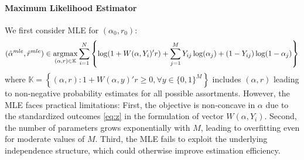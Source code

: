 \documentclass[11pt]{article}
\newcommand{\argmax}{\operatornamewithlimits{argmax}}
\begin{document}
\paragraph{Maximum Likelihood Estimator} We first consider MLE for $(\alpha_0,r_0)$:
$$(\hat \alpha^{mle}, \hat r^{mle}) \in \argmax_{(\alpha,r)\in \mathbb{K}} \sum_{i=1}^N\left\{\log( 1+W(\alpha,Y_i)'r )+ \sum_{j=1}^M Y_{ij} \log(\alpha_j)+ (1-Y_{ij}) \log(1-\alpha_j)\right\}$$
where $\mathbb{K}= \left\{ (\alpha,r) :  1+W(\alpha,y)'r \geq 0, \forall y\in\{0,1\}^M\right\}$ includes $(\alpha,r)$ leading to non-negative probability estimates for all possible assortments. However, the MLE faces practical limitations: First, the objective is non-concave in $\alpha$ due to the standardized outcomes \eqref{eq:z} in the formulation of vector $W(\alpha,Y_i)$. Second, the number of parameters grows exponentially with $M$, leading to overfitting even for moderate values of $M$. Third, the MLE fails to exploit the underlying independence structure, which could otherwise improve estimation efficiency.
\end{document}
